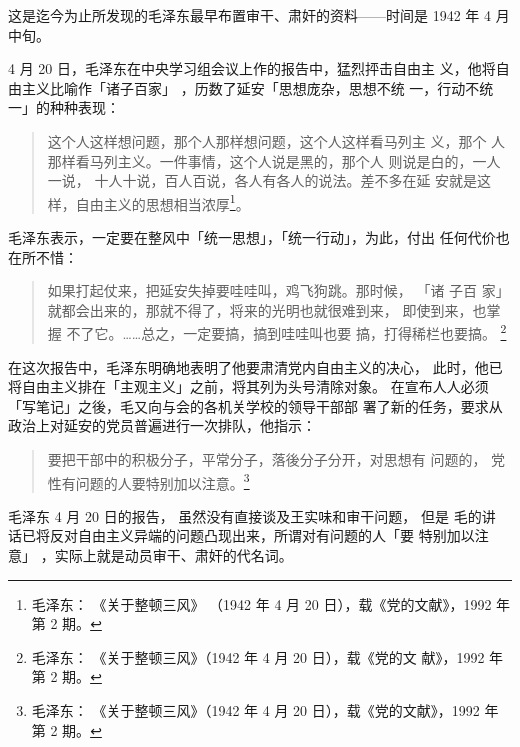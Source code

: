 这是迄今为止所发现的毛泽东最早布置审干、肃奸的资料——时间是
1942 年 4 月中旬。

4 月 20 日，毛泽东在中央学习组会议上作的报告中，猛烈抨击自由主
义，他将自由主义比喻作「诸子百家」
，历数了延安「思想庞杂，思想不统
一，行动不统一」的种种表现：
\begin{quote}
{\fzwkai 这个人这样想问题，那个人那样想问题，这个人这样看马列主 义，那个
人那样看马列主义。一件事情，这个人说是黑的，那个人 则说是白的，一人一说，
十人十说，百人百说，各人有各人的说法。差不多在延
安就是这样，自由主义的思想相当浓厚\footnote{毛泽东： 《关于整顿三风》
（1942 年 4 月 20 日），载《党的文献》，1992 年第 2 期。}。} 
\end{quote}

毛泽东表示，一定要在整风中「统一思想」，「统一行动」，为此，付出
任何代价也在所不惜：
\begin{quote}
{\fzwkai 如果打起仗来，把延安失掉要哇哇叫，鸡飞狗跳。那时候， 「诸 子百
家」就都会出来的，那就不得了，将来的光明也就很难到来， 即使到来，也掌握
不了它。……总之，一定要搞，搞到哇哇叫也要 搞，打得稀栏也要搞。
\footnote{毛泽东： 《关于整顿三风》（1942 年 4 月 20 日），载《党的文
献》，1992 年第 2 期。}} 
\end{quote}

在这次报告中，毛泽东明确地表明了他要肃清党内自由主义的决心，
此时，他已将自由主义排在「主观主义」之前，将其列为头号清除对象。
在宣布人人必须「写笔记」之後，毛又向与会的各机关学校的领导干部部
署了新的任务，要求从政治上对延安的党员普遍进行一次排队，他指示：
\begin{quote}
{\fzwkai 要把干部中的积极分子，平常分子，落後分子分开，对思想有 问题的，
党性有问题的人要特别加以注意。\footnote{毛泽东： 《关于整顿三风》（1942
年 4 月 20 日），载《党的文献》，1992 年第 2 期。}} 
\end{quote}

毛泽东 4 月 20 日的报告， 虽然没有直接谈及王实味和审干问题， 但是 毛的讲
话已将反对自由主义异端的问题凸现出来，所谓对有问题的人「要 特别加以注意」
，实际上就是动员审干、肃奸的代名词。

